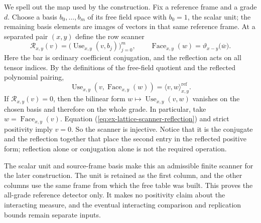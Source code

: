 We spell out the map used by the construction. Fix a reference frame and a
grade $d$. Choose a basis $b_0,\ldots,b_m$ of its free field space with
$b_0=1$, the scalar unit; the remaining basis elements are images of
vectors in that same reference frame. At a separated pair $(x,y)$ define
the row scanner
\[
 \mathcal R_{x,y}(v)
   =\bigl(\operatorname{Use}_{x,y}(v,b_j)\bigr)_{j=0}^{m},
 \qquad
 \operatorname{Face}_{x,y}(w)
   =\vartheta_{x-y}\bigl(\overline w\bigr).
\]
Here the bar is ordinary coefficient conjugation, and the reflection acts
on all tensor indices. By the definitions of the free-field quotient and
the reflected polynomial pairing,
\begin{equation}\label{eq:ex-lattice-scanner-reflection}
 \operatorname{Use}_{x,y}
   (v,\operatorname{Face}_{x,y}(w))
 =\langle v,w\rangle_{x,y}^{\mathrm{ref}}.
\end{equation}
If $\mathcal R_{x,y}(v)=0$, then the bilinear form
$w\mapsto\operatorname{Use}_{x,y}(v,w)$ vanishes on the chosen basis and
therefore on the whole grade. In particular, take
$w=\operatorname{Face}_{x,y}(v)$. Equation
(\ref{eq:ex-lattice-scanner-reflection}) and strict positivity imply
$v=0$. So the scanner is injective. Notice that it is the conjugate and
the reflection together that place the second entry in the reflected
positive form; reflection alone or conjugation alone is not the required
operation.

The scalar unit and source-frame basis make this an admissible finite
scanner for the later construction. The unit is retained as the first
column, and the other columns use the same frame from which the free table
was built. This proves the all-grade reference detector only. It makes no
positivity claim about the interacting measure, and the eventual
interacting comparison and replication bounds remain separate inputs.
